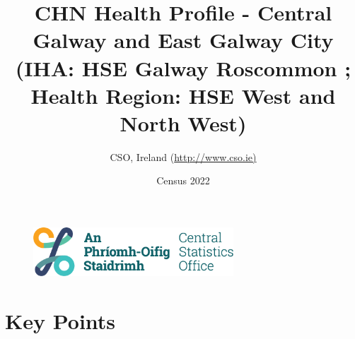 \documentclass{article}
\title{CHN Health Profile - Central Galway and East Galway City (IHA: HSE Galway Roscommon ;  Health Region: HSE West and North West) }
\date{Census 2022}
\author{CSO, Ireland  (\url{http://www.cso.ie)}}
\begin{document}


\begin{figure}
	\centering
\includegraphics[width =75mm]{../figures/CSO_Logo.png}
\end{figure}

				 
		   
						  
														  
																																													
												 
			 
\maketitle
					
													   
				 
						 
																																																																											   
				 
				  
  \pagebreak
    	    \tableofcontents

\pagebreak


\section{Key Points}
\end{document}
